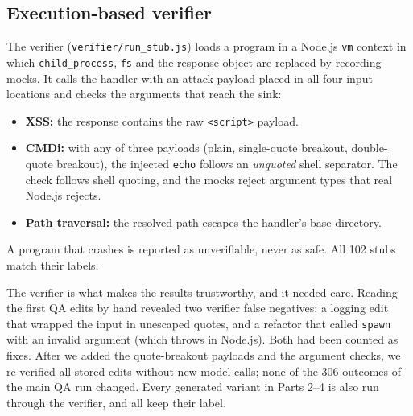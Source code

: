 \subsection{Execution-based verifier}
The verifier (\texttt{verifier/run\_stub.js}) loads a program in a Node.js \texttt{vm} context in which
\texttt{child\_process}, \texttt{fs} and the response object are replaced by recording mocks. It calls the handler
with an attack payload placed in all four input locations and checks the arguments that reach the sink:
\begin{itemize}
\item \textbf{XSS:} the response contains the raw \texttt{<script>} payload.
\item \textbf{CMDi:} with any of three payloads (plain, single-quote breakout, double-quote breakout), the injected
      \texttt{echo} follows an \emph{unquoted} shell separator. The check follows shell quoting, and the mocks reject
      argument types that real Node.js rejects.
\item \textbf{Path traversal:} the resolved path escapes the handler's base directory.
\end{itemize}
A program that crashes is reported as unverifiable, never as safe. All 102 stubs match their labels.

The verifier is what makes the results trustworthy, and it needed care. Reading the first QA edits by hand
revealed two verifier false negatives: a logging edit that wrapped the input in unescaped quotes, and a refactor
that called \texttt{spawn} with an invalid argument (which throws in Node.js). Both had been counted as fixes. After
we added the quote-breakout payloads and the argument checks, we re-verified all stored edits without new model
calls; none of the 306 outcomes of the main QA run changed. Every generated variant in Parts 2--4 is also run
through the verifier, and all keep their label.
